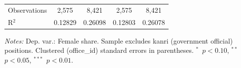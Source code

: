 \begin{table}[htbp]
\begin{threeparttable}
\begin{tabular}{lcccc}
   \midrule
   Observations          & 2,575                   & 8,421                        & 2,575                   & 8,421\\  
   R$^2$                 & 0.12829                 & 0.26098                      & 0.12803                 & 0.26078\\  
   \midrule \midrule
\end{tabular}
\par\endgroup
\begin{tablenotes}[flushleft]
\footnotesize
\item \textit{Notes:} Dep. var.: Female share. Sample excludes kanri (government official) positions. Clustered (office\_id) standard errors in parentheses. $^{*}$~$p<0.10$, $^{**}$~$p<0.05$, $^{***}$~$p<0.01$.
\end{tablenotes}
\end{threeparttable}
\end{table}
